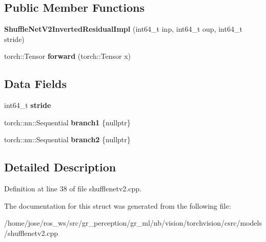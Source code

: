 \subsection*{Public Member Functions}
\begin{DoxyCompactItemize}
\item 
\mbox{\label{structvision_1_1models_1_1ShuffleNetV2InvertedResidualImpl_a7965474f3a2778fe4f7305a30acc902c}} 
{\bfseries Shuffle\+Net\+V2\+Inverted\+Residual\+Impl} (int64\+\_\+t inp, int64\+\_\+t oup, int64\+\_\+t stride)
\item 
\mbox{\label{structvision_1_1models_1_1ShuffleNetV2InvertedResidualImpl_ade7d96a64af213f4194aab3721d1f4df}} 
torch\+::\+Tensor {\bfseries forward} (torch\+::\+Tensor x)
\end{DoxyCompactItemize}
\subsection*{Data Fields}
\begin{DoxyCompactItemize}
\item 
\mbox{\label{structvision_1_1models_1_1ShuffleNetV2InvertedResidualImpl_a2aac05c6f92845434e966a8b60711d8c}} 
int64\+\_\+t {\bfseries stride}
\item 
\mbox{\label{structvision_1_1models_1_1ShuffleNetV2InvertedResidualImpl_a188a09c8c558bcce89f4a368138e257a}} 
torch\+::nn\+::\+Sequential {\bfseries branch1} \{nullptr\}
\item 
\mbox{\label{structvision_1_1models_1_1ShuffleNetV2InvertedResidualImpl_a26dbc52eaaadea43e1c167e9a619122e}} 
torch\+::nn\+::\+Sequential {\bfseries branch2} \{nullptr\}
\end{DoxyCompactItemize}


\subsection{Detailed Description}


Definition at line 38 of file shufflenetv2.\+cpp.



The documentation for this struct was generated from the following file\+:\begin{DoxyCompactItemize}
\item 
/home/jose/ros\+\_\+ws/src/gr\+\_\+perception/gr\+\_\+ml/nb/vision/torchvision/csrc/models/shufflenetv2.\+cpp\end{DoxyCompactItemize}
